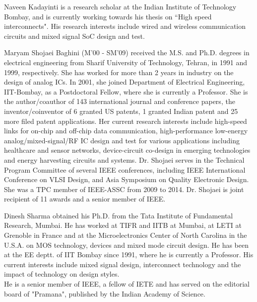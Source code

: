 \documentclass[journal,twoside,letterpaper]{IEEEtran}
\begin{document}
\begin{IEEEbiography}{Naveen Kadayinti}
is a research scholar at the Indian Institute of Technology
Bombay, and is currently working towards 
his thesis on ``High speed interconnects". 
His research interests include wired and wireless communication circuits
and mixed signal SoC design and test.
\end{IEEEbiography}
\begin{IEEEbiography}{Maryam Shojaei Baghini}
(M'00 - SM'09) received the M.S. and Ph.D. degrees
in electrical engineering from Sharif University of Technology, Tehran, in
1991 and 1999, respectively. She has worked for more than 2
years in industry on the design of analog ICs. In 2001, she joined
Department of Electrical Engineering, IIT-Bombay, as a Postdoctoral
Fellow, where she is currently a Professor. She is the author/coauthor of
143 international journal and conference papers, the
inventor/coinventor of 6 granted US patents, 1 granted Indian patent and
25 more filed patent applications.  Her current research interests include
high-speed links for on-chip and off-chip data communication,
high-performance low-energy analog/mixed-signal/RF IC design and test for
various applications including healthcare and sensor networks,
device-circuit co-design in emerging technologies and energy harvesting
circuits and systems. Dr. Shojaei serves in the Technical Program
Committee of several IEEE conferences, including IEEE International
Conference on VLSI Design, and Asia Symposium on Quality Electronic
Design. She was a TPC member of IEEE-ASSC from 2009 to 2014. Dr. Shojaei
is joint recipient of 11 awards
and a senior member of IEEE.
\end{IEEEbiography}
\vfill
\begin{IEEEbiography}{Dinesh Sharma} 
obtained his Ph.D. from the Tata Institute of Fundamental
Research, Mumbai. He has worked at TIFR and IITB at Mumbai, at LETI at Grenoble in
France and at the Microelectronics Center of North Carolina in the U.S.A. on MOS
technology, devices and mixed mode circuit design. He has been at the EE deptt. of IIT
Bombay since 1991, where he is currently a Professor. His current interests include mixed
signal design, interconnect technology and the impact of technology on design styles.
\\
He is a senior member of IEEE, a fellow of IETE and has served on the editorial board of
"Pramana", published by the Indian Academy of Science.
\end{IEEEbiography}

\vfill
\end{document}
